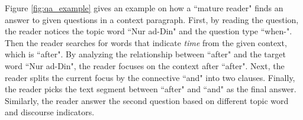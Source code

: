 Figure \ref{fig:qa_example} gives an example on how a ``mature reader" finds an answer to given questions in a context paragraph. First, by reading the question, the reader notices the topic word ``Nur ad-Din" and the question type ``when-". Then the reader searches for words that indicate \emph{time} from the given context, which is ``after". By analyzing the relationship between ``after" and the target word ``Nur ad-Din", the reader focuses on the context after ``after". Next, the reader splits the current focus by the connective ``and" into two clauses. Finally, the reader picks the text segment between ``after" and ``and" as the final answer. Similarly, the reader answer the second question based on different topic word and discourse indicators.







